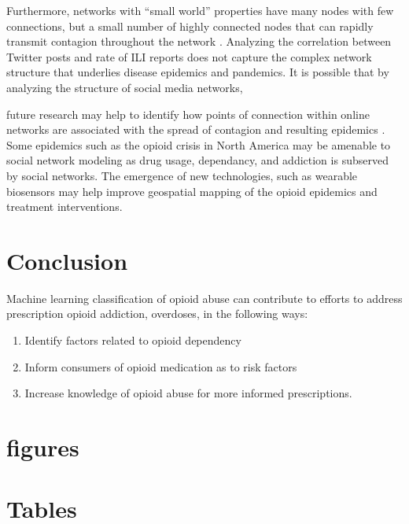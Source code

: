 \documentclass[sigconf]{acmart}
\begin{document}
Furthermore, networks with ``small world'' properties have many nodes with 
few connections, but a small number of highly connected nodes that can rapidly 
transmit contagion throughout the network \cite{watts98}. Analyzing the 
correlation between Twitter posts and rate of ILI reports does not capture the 
complex network structure that underlies disease epidemics and pandemics. 
It is possible that by analyzing the structure of social media networks, 

future research may help to identify how points of connection within online
networks are associated with the spread of contagion and resulting epidemics 
\cite{zhu17}. Some epidemics such as the opioid crisis in North America 
\cite{volkow14} may be amenable to social network modeling as drug usage, 
dependancy, and addiction is subserved by social networks. The emergence of 
new technologies, such as wearable biosensors \cite{carreiro15} may help 
improve geospatial mapping of the opioid epidemics and treatment interventions.

\section{Conclusion}

Machine learning classification of opioid abuse can contribute to efforts to address prescription opioid addiction, overdoses, in the following ways: 
\begin{enumerate}
\item Identify factors related to opioid dependency
\item Inform consumers of opioid medication as to risk factors 
\item Increase knowledge of opioid abuse for more informed prescriptions. 
\end{enumerate}



\section{figures}




\section{Tables}
\end{document}
